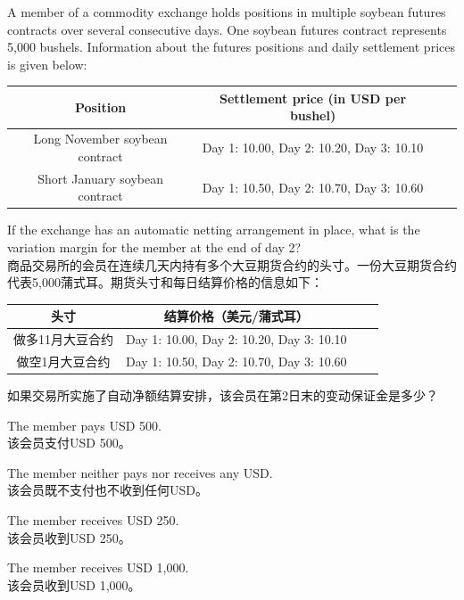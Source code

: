 \documentclass{article}
\newcounter{question} %
\begin{document}
\begin{question}
    A member of a commodity exchange holds positions in multiple soybean futures contracts over several consecutive days. One soybean futures contract represents 5,000 bushels. Information about the futures positions and daily settlement prices is given below:

    \begin{tabular}{|c|c|c|c|}
    \hline
    Position & Settlement price (in USD per bushel) \\
    \hline
    Long November soybean contract & Day 1: 10.00, Day 2: 10.20, Day 3: 10.10 \\
    Short January soybean contract & Day 1: 10.50, Day 2: 10.70, Day 3: 10.60 \\
    \hline
    \end{tabular}

    If the exchange has an automatic netting arrangement in place, what is the variation margin for the member at the end of day 2?\\
    商品交易所的会员在连续几天内持有多个大豆期货合约的头寸。一份大豆期货合约代表5,000蒲式耳。期货头寸和每日结算价格的信息如下：

    \begin{tabular}{|c|c|c|c|}
    \hline
    头寸 & 结算价格（美元/蒲式耳） \\
    \hline
    做多11月大豆合约 & Day 1: 10.00, Day 2: 10.20, Day 3: 10.10 \\
    做空1月大豆合约 & Day 1: 10.50, Day 2: 10.70, Day 3: 10.60 \\
    \hline
    \end{tabular}

    如果交易所实施了自动净额结算安排，该会员在第2日末的变动保证金是多少？\\

\end{question}

\begin{choices}
    \item The member pays USD 500. \\
    该会员支付USD 500。
    \item The member neither pays nor receives any USD.\\
    该会员既不支付也不收到任何USD。
    \item The member receives USD 250. \\
    该会员收到USD 250。
    \item The member receives USD 1,000. \\
    该会员收到USD 1,000。
\end{choices}
\end{document}
